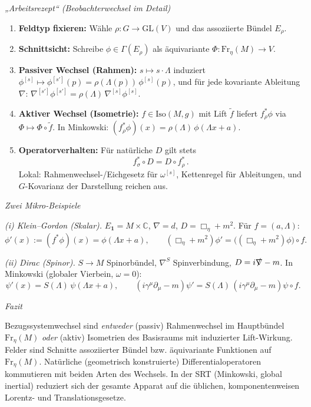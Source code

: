 \documentclass[10pt, letterpaper]{article}
\newcommand{\C}{\mathbb{C}}
\newcommand{\Iso}{\mathrm{Iso}}
\newcommand{\GL}{\mathrm{GL}}
\begin{document}
\emph{„Arbeitsrezept“ (Beobachterwechsel im Detail)}

\begin{enumerate}
\item \textbf{Feldtyp fixieren:} Wähle $\rho:G\to\GL(V)$ und das assoziierte Bündel $E_\rho$.
\item \textbf{Schnittsicht:} Schreibe $\phi\in\Gamma(E_\rho)$ als äquivariante $\Phi:\mathrm{Fr}_\eta(M)\to V$.
\item \textbf{Passiver Wechsel (Rahmen):} $s\mapsto s\cdot\Lambda$ induziert
$\phi^{[s]}\mapsto \phi^{[s']}(p)=\rho(\Lambda(p))\,\phi^{[s]}(p)$,
und für jede kovariante Ableitung $\nabla$:
$\nabla^{[s']}\phi^{[s']}=\rho(\Lambda)\,\nabla^{[s]}\phi^{[s]}$.
\item \textbf{Aktiver Wechsel (Isometrie):} $f\in\Iso(M,g)$ mit Lift $\tilde f$ liefert
$f^*_\rho\phi$ via $\Phi\mapsto \Phi\circ\tilde f$.
In Minkowski: $(f^*_\rho\phi)(x)=\rho(\Lambda)\,\phi(\Lambda x+a)$.
\item \textbf{Operatorverhalten:} Für natürliche $D$ gilt stets
\[
\boxed{\,f^*_\sigma\circ D = D\circ f^*_\rho\,}.
\]
Lokal: Rahmenwechsel-/Eichgesetz für $\omega^{[s]}$, Kettenregel für Ableitungen,
und $G$-Kovarianz der Darstellung reichen aus.
\end{enumerate}

\emph{Zwei Mikro-Beispiele}

\emph{(i) Klein–Gordon (Skalar).}
$E_{\mathbf 1}=M\times\C$, $\nabla=d$, $D=\Box_\eta+m^2$.
Für $f=(a,\Lambda)$:
\[
\phi'(x):=(f^* \phi)(x)=\phi(\Lambda x+a),\qquad
(\Box_\eta+m^2)\phi'= \big((\Box_\eta+m^2)\phi\big)\!\circ f.
\]

\emph{(ii) Dirac (Spinor).}
$S\to M$ Spinorbündel, $\nabla^S$ Spinverbindung, $D=i\slashed{\nabla} - m$.
In Minkowski (globaler Vierbein, $\omega=0$):
\[
\psi'(x)=S(\Lambda)\,\psi(\Lambda x+a),\qquad
(i\gamma^\mu\partial_\mu-m)\psi' = S(\Lambda)\,(i\gamma^\mu\partial_\mu-m)\psi\circ f.
\]

\emph{Fazit}

Bezugssystemwechsel sind \emph{entweder} (passiv) Rahmenwechsel im Hauptbündel $\mathrm{Fr}_\eta(M)$
\emph{oder} (aktiv) Isometrien des Basisraums mit induzierter Lift-Wirkung.
Felder sind Schnitte assoziierter Bündel bzw. äquivariante Funktionen auf $\mathrm{Fr}_\eta(M)$.
Natürliche (geometrisch konstruierte) Differentialoperatoren kommutieren
mit beiden Arten des Wechsels. In der SRT (Minkowski, global inertial)
reduziert sich der gesamte Apparat auf die üblichen, komponentenweisen Lorentz- und
Translationsgesetze.
\end{document}
